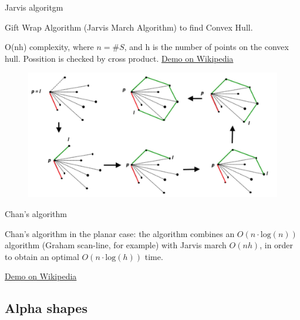 \begin{frame}{Jarvis algoritgm\cite{Jarvis1973}}

    Gift Wrap Algorithm (Jarvis March Algorithm) to find Convex Hull. 
    
    O(nh) complexity, where $n = \#S$, and h is the number of points on the
convex hull. Possition is checked by cross product.
        \href{https://en.wikipedia.org/wiki/Gift_wrapping_algorithm}{Demo on Wikipedia}
        \begin{figure}
            \centering
            \includegraphics[width=\textwidth]{figs/L14-jarvis-algorithm.jpg}
        \end{figure}
        
\end{frame}

\begin{frame}{Chan's algorithm\cite{Chan1996}}

Chan’s algorithm in the planar case: the algorithm combines an
$O(n \cdot \mathrm{log} ( n))$
algorithm (Graham scan-line, for example) with Jarvis march $O(nh)$, in
order to obtain an optimal $O(n \cdot \mathrm{log}(h))$ time.

\href{https://en.wikipedia.org/wiki/Chan\%27s_algorithm}{Demo on Wikipedia}

    
\end{frame}

\subsection{Alpha shapes}

